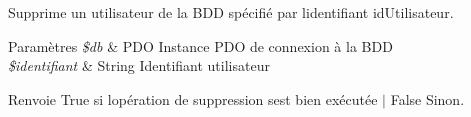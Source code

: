 Supprime un utilisateur de la B\+DD spécifié par l\textquotesingle{}identifiant \textquotesingle{}id\+Utilisateur\textquotesingle{}. 


\begin{DoxyParams}{Paramètres}
{\em \$db} & P\+DO Instance P\+DO de connexion à la B\+DD \\
\hline
{\em \$identifiant} & String Identifiant utilisateur \\
\hline
\end{DoxyParams}
\begin{DoxyReturn}{Renvoie}
True si l\textquotesingle{}opération de suppression s\textquotesingle{}est bien exécutée $\vert$ False Sinon. 
\end{DoxyReturn}
